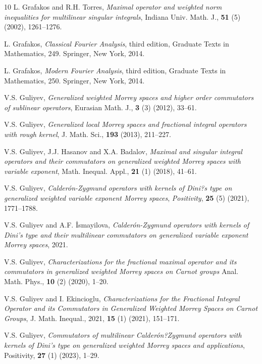 \documentclass[11pt, twoside, leqno]{article}
\begin{document}
\begin{thebibliography}{10}
	L. Grafakos and R.H. Torres, \emph{Maximal operator and weighted norm inequalities for multilinear singular integrals}, Indiana Univ. Math. J., \textbf{51} (5) (2002), 1261--1276.
	
	L. Grafakos, \emph{Classical Fourier Analysis}, third edition, Graduate Texts in Mathematics, 249. Springer, New York, 2014. 
	
	L. Grafakos, \emph{Modern Fourier Analysis}, third edition, Graduate Texts in Mathematics, 250. Springer, New York, 2014. 
	
	V.S. Guliyev, \emph{Generalized weighted Morrey spaces and higher order commutators of sublinear operators}, Eurasian Math. J., \textbf{3} (3) (2012), 33--61.
	
	V.S. Guliyev, \emph{Generalized local Morrey spaces and fractional integral operators with rough kernel}, J. Math. Sci., \textbf{193} (2013), 211--227.
	
	V.S. Guliyev, J.J. Hasanov and X.A. Badalov,  \emph{Maximal and singular integral operators and their commutators on generalized weighted Morrey spaces with variable exponent}, Math. Inequal. Appl., \textbf{21} (1) (2018), 41--61.
	
	V.S. Guliyev, \emph{Calder\'{o}n-Zygmund operators with kernels of Dini?s type on generalized weighted variable exponent Morrey spaces},
	\textit{Positivity}, \textbf{25} (5) (2021), 1771--1788.
	
	V.S. Guliyev and A.F. İsmayilova, \emph{Calder\'{o}n-Zygmund operators with kernels of Dini’s type and their multilinear commutators on generalized variable exponent Morrey spaces},  2021.
	
	V.S. Guliyev, \emph{Characterizations for the fractional maximal operator and its commutators in generalized weighted Morrey spaces on Carnot groups} 
	Anal. Math. Phys., \textbf{10} (2) (2020), 1--20. 
	
	V.S. Guliyev and I. Ekincioglu, \emph{Characterizations for the Fractional Integral Operator and its Commutators in Generalized Weighted Morrey Spaces on Carnot Groups}, J. Math. Inequal., 2021, \textbf{15} (1) (2021), 151--171.
	
	V.S. Guliyev, \emph{Commutators of multilinear Calder\'{o}n?Zygmund operators with kernels of Dini's type on generalized weighted Morrey spaces and applications},
	Positivity, \textbf{27} (1) (2023), 1--29. 
	

\end{thebibliography}
\end{document}
